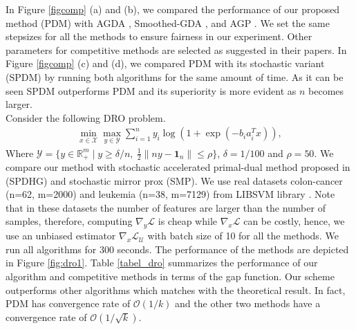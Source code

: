 \documentclass[letterpaper,11 pt]{article}
\newcommand{\afj}[1]{{\color{black}#1}}
\newcommand{\mrt}[1]{{\color{black}#1}}
\begin{document}
In Figure \ref{figcomp} (a) and (b), we compared the performance of our proposed method (PDM) with AGDA \cite{yang2020global}, \afj{Smoothed-GDA \cite{zhang2020single}, and AGP \cite{xu2020unified}. We set the same stepsizes for all the methods to ensure fairness in our experiment. Other parameters for competitive methods are selected as suggested in their papers.} %
In Figure \ref{figcomp} (c) and (d), we compared PDM with its stochastic variant (SPDM) by running both algorithms for the same amount of time. As it can be seen SPDM outperforms PDM and its superiority is more evident as $n$ becomes larger.\\
\mrt{{\bf Distributionally robust optimization.}
Consider the following DRO problem.
     \begin{align*}
        \min_{x\in \mathcal X}\max_{y\in \mathcal Y} \sum_{i=1}^n y_i \log (1+\exp(-b_i a_{i}^T x)) ,
     \end{align*}
     Where $\mathcal Y = \{y\in \mathbb R^m_{+}\mid y\geq \delta/n, \ \tfrac{1}{2}\|ny-\mathbf 1_n\|\leq \rho\} $, $\delta = 1/100 $ and $\rho = 50$. We compare our method with stochastic accelerated primal-dual method proposed in \cite{zhao2021accelerated} (SPDHG) and stochastic mirror prox \cite{juditsky2011solving} (SMP). We use real datasets colon-cancer (n=62, m=2000) and leukemia (n=38, m=7129) from  LIBSVM library \cite{libsvm}. Note that in these datasets the number of features are larger than the number of samples, therefore, computing $\nabla_y \mathcal L$ is cheap while $\nabla_x \mathcal L$ can be costly, hence, we use an unbiased estimator $\nabla_x \mathcal L_{\mathcal U}$ with batch size of 10 for all the methods. We run all algorithms for 300 seconds. The performance of the methods are depicted in Figure \ref{fig:dro1}. Table \ref{tabel_dro} summarizes the performance of our algorithm and competitive methods in terms of the gap function. Our scheme outperforms other algorithms which matches with the theoretical result. In fact, PDM has convergence rate of $\mathcal O(1/k)$ and the other two methods have a convergence rate of $\mathcal O(1/\sqrt k)$.}
\end{document}
